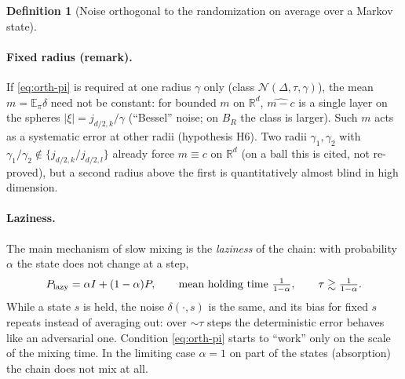 \documentclass[10pt,a4paper]{article}
\newcommand{\E}{\mathbb E}\newcommand{\R}{\mathbb R}
\theoremstyle{definition}\newtheorem{definition}{Definition}
\begin{document}
\begin{definition}[Noise orthogonal to the randomization on average over a Markov state]
\paragraph{Fixed radius (remark).} If \eqref{eq:orth-pi} is required at one radius $\gamma$ only (class $\mathcal N(\Delta,\tau,\gamma)$), the mean $m=\E_\pi\delta$ need not be constant: for bounded $m$ on $\R^d$, $\widehat{m-c}$ is a single layer on the spheres $|\xi|=j_{d/2,k}/\gamma$ (``Bessel'' noise; on $B_R$ the class is larger). Such $m$ acts as a systematic error at other radii (hypothesis H6). Two radii $\gamma_1,\gamma_2$ with $\gamma_1/\gamma_2\notin\{j_{d/2,k}/j_{d/2,l}\}$ already force $m\equiv c$ on $\R^d$ (on a ball this is cited, not re-proved), but a second radius above the first is quantitatively almost blind in high dimension.
\end{definition}

\paragraph{Laziness.} The main mechanism of slow mixing is the \emph{laziness} of the chain: with probability $\alpha$ the state does not change at a step,
\[
P_{\rm lazy}=\alpha I+(1-\alpha)P,\qquad \text{mean holding time}\ \tfrac1{1-\alpha},\qquad \tau\gtrsim\tfrac1{1-\alpha}.
\]
While a state $s$ is held, the noise $\delta(\cdot,s)$ is the same, and its bias for fixed $s$ repeats instead of averaging out: over $\sim\tau$ steps the deterministic error behaves like an adversarial one. Condition \eqref{eq:orth-pi} starts to ``work'' only on the scale of the mixing time. In the limiting case $\alpha=1$ on part of the states (absorption) the chain does not mix at all.
\end{document}
